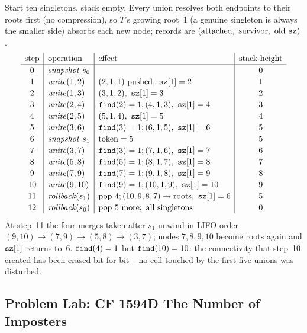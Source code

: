 \begin{tracebox}
Start ten singletons, stack empty.  Every union resolves both endpoints to
their roots first (no compression), so \(T\)'s growing root~1 (a genuine
singleton is always the smaller side) absorbs each new node; records are
\((\text{attached},\ \text{survivor},\ \text{old }\code{sz})\).
\[
\renewcommand{\arraystretch}{1.15}
\begin{array}{c|l|l|c}
\text{step} & \text{operation} & \text{effect} & \text{stack height} \\ \hline
0 & \mathit{snapshot}\ s_0 & & 0\\
1 & \mathit{unite}(1,2) & (2,1,1)\ \text{pushed},\ \code{sz}[1]=2 & 1\\
2 & \mathit{unite}(1,3) & (3,1,2),\ \code{sz}[1]=3 & 2\\
3 & \mathit{unite}(2,4) & \code{find}(2)=1;(4,1,3),\ \code{sz}[1]=4 & 3\\
4 & \mathit{unite}(2,5) & (5,1,4),\ \code{sz}[1]=5 & 4\\
5 & \mathit{unite}(3,6) & \code{find}(3)=1;(6,1,5),\ \code{sz}[1]=6 & 5\\
6 & \mathit{snapshot}\ s_1 & \text{token}=5 & 5\\
7 & \mathit{unite}(3,7) & \code{find}(3)=1;(7,1,6),\ \code{sz}[1]=7 & 6\\
8 & \mathit{unite}(5,8) & \code{find}(5)=1;(8,1,7),\ \code{sz}[1]=8 & 7\\
9 & \mathit{unite}(7,9) & \code{find}(7)=1;(9,1,8),\ \code{sz}[1]=9 & 8\\
10& \mathit{unite}(9,10)& \code{find}(9)=1;(10,1,9),\ \code{sz}[1]=10 & 9\\
11& \mathit{rollback}(s_1) & \text{pop }4;(10,9,8,7)\to\text{roots},\ \code{sz}[1]=6 & 5\\
12& \mathit{rollback}(s_0) & \text{pop }5\text{ more};\ \text{all singletons} & 0
\end{array}
\]
At step~11 the four merges taken after \(s_1\) unwind in LIFO order
\((9,10)\to(7,9)\to(5,8)\to(3,7)\); nodes \(7,8,9,10\) become roots again and
\(\texttt{sz}[1]\) returns to~6.  \(\texttt{find}(4)=1\) but
\(\texttt{find}(10)=10\): the connectivity that step~10 created has been erased
bit-for-bit -- no cell touched by the first five unions was disturbed.
\end{tracebox}

\subsection{Problem Lab: CF 1594D The Number of Imposters}

